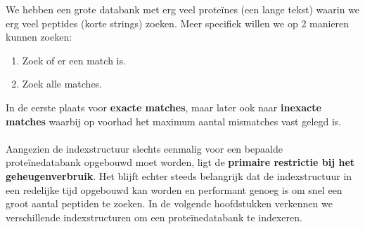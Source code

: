 We hebben een grote databank met erg veel proteïnes (een lange tekst) waarin we erg veel peptides (korte strings) zoeken.
Meer specifiek willen we op 2 manieren kunnen zoeken:
\begin{enumerate}
    \item Zoek of er een match is.
    \item Zoek alle matches.
\end{enumerate}
In de eerste plaats voor \textbf{exacte matches}, maar later ook naar \textbf{inexacte matches} waarbij op voorhad het maximum aantal mismatches vast gelegd is.
\\ \\
Aangezien de indexstructuur slechts eenmalig voor een bepaalde proteïnedatabank opgebouwd moet worden, ligt de \textbf{primaire restrictie bij het geheugenverbruik}.
Het blijft echter steeds belangrijk dat de indexstructuur in een redelijke tijd opgebouwd kan worden en performant genoeg is om snel een groot aantal peptiden te zoeken. %
In de volgende hoofdstukken verkennen we verschillende indexstructuren om een proteïnedatabank te indexeren.


